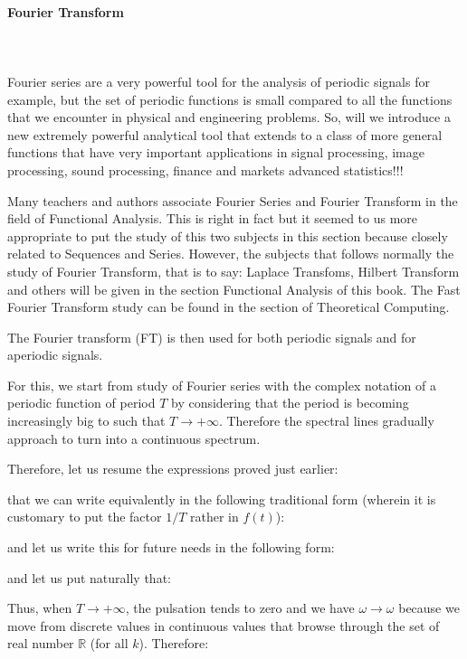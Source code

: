 	
	\pagebreak
	\paragraph{Fourier Transform}\mbox{}\\\\
	Fourier series are a very powerful tool for the analysis of periodic signals for example, but the set of periodic functions is small compared to all the functions that we encounter in physical and engineering problems. So, will we introduce a new extremely powerful analytical tool that extends to a class of more general functions that have very important applications in signal processing, image processing, sound processing, finance and markets advanced statistics!!!
	
	\begin{tcolorbox}[title=Remark,colframe=black,arc=10pt]
	Many teachers and authors associate Fourier Series and Fourier Transform in the field of Functional Analysis. This is right in fact but it seemed to us more appropriate to put the study of this two subjects in this section because closely related to Sequences and Series. However, the subjects that follows normally the study of Fourier Transform, that is to say: Laplace Transfoms, Hilbert Transform and others will be given in the section Functional Analysis of this book. The Fast Fourier Transform study can be found in the section of Theoretical Computing.
	\end{tcolorbox}
	The Fourier transform (FT) is then used for both periodic signals and for aperiodic signals.
	
	For this, we start from study of Fourier series with the complex notation of a periodic function of period $T$ by considering that the period is becoming increasingly big to such that $T\rightarrow +\infty$. Therefore the spectral lines gradually approach to turn into a continuous spectrum.
	
	Therefore, let us resume the expressions proved just earlier:
	
	that we can write equivalently in the following traditional form (wherein it is customary to put the factor $1 / T$ rather in $f (t)$):
	
	and let us write this for future needs in the following form:
		
	and let us put naturally that:
	
	Thus, when $T\rightarrow +\infty$, the pulsation tends to zero and we have $\omega\rightarrow \omega$ because we move from discrete values in continuous values that browse through the set of real number $\mathbb{R}$ (for all $k$). Therefore:
	
